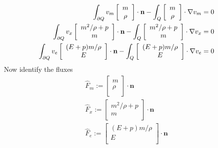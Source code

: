\documentclass{article}
\begin{document}
\begin{align*}
\int_{\partial Q}v_m
\left[
\begin{array}{c}
   m\\
   \rho\\
\end{array}
\right]
\cdot\mathbf{n}
-
\int_Q
\left[
\begin{array}{c}
   m\\
   \rho\\
\end{array}
\right]
\cdot\nabla v_m
&=0\\
\int_{\partial Q}v_x
\left[
\begin{array}{c}
   m^2/\rho+p\\
   m\\
\end{array}
\right]
\cdot\mathbf{n}
-
\int_Q
\left[
\begin{array}{c}
   m^2/\rho+p\\
   m\\
\end{array}
\right]
\cdot\nabla v_x
&=0\\
\int_{\partial Q}v_e
\left[
\begin{array}{c}
   (E + p)m/\rho\\
   E\\
\end{array}
\right]
\cdot\mathbf{n}
-
\int_Q
\left[
\begin{array}{c}
   (E + p)m/\rho\\
   E\\
\end{array}
\right]
\cdot\nabla v_e
&=0
\end{align*}
Now identify the fluxes
\begin{align*}
\hat F_m:=
\left[
\begin{array}{c}
   m\\
   \rho\\
\end{array}
\right]
\cdot\mathbf{n}\\
\hat F_x:=
\left[
\begin{array}{c}
   m^2/\rho+p\\
   m\\
\end{array}
\right]
\cdot\mathbf{n}\\
\hat F_e:=
\left[
\begin{array}{c}
   (E + p)m/\rho\\
   E\\
\end{array}
\right]
\cdot\mathbf{n}\\
\end{align*}
\end{document}
